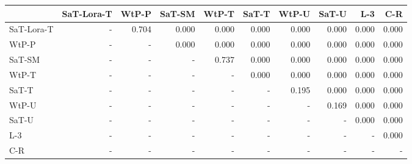 \begin{tabular}{lrrrrrrrrr}
\toprule
 & SaT-Lora-T & WtP-P & SaT-SM & WtP-T & SaT-T & WtP-U & SaT-U & L-3 & C-R \\
\midrule
SaT-Lora-T & - & 0.704 & 0.000 & 0.000 & 0.000 & 0.000 & 0.000 & 0.000 & 0.000 \\
WtP-P & - & - & 0.000 & 0.000 & 0.000 & 0.000 & 0.000 & 0.000 & 0.000 \\
SaT-SM & - & - & - & 0.737 & 0.000 & 0.000 & 0.000 & 0.000 & 0.000 \\
WtP-T & - & - & - & - & 0.000 & 0.000 & 0.000 & 0.000 & 0.000 \\
SaT-T & - & - & - & - & - & 0.195 & 0.000 & 0.000 & 0.000 \\
WtP-U & - & - & - & - & - & - & 0.169 & 0.000 & 0.000 \\
SaT-U & - & - & - & - & - & - & - & 0.000 & 0.000 \\
L-3 & - & - & - & - & - & - & - & - & 0.000 \\
C-R & - & - & - & - & - & - & - & - & - \\
\bottomrule
\end{tabular}

